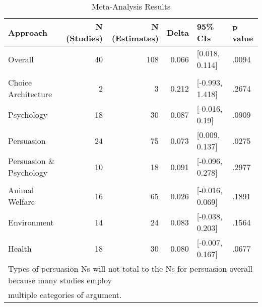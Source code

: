 \documentclass[sn-nature,referee,pdflatex]{sn-jnl}
\begin{document}
\begin{table}

\caption{\label{tab:table_one}Meta-Analysis Results}
\centering
\begin{tabular}[t]{lrrrll}
\toprule
Approach & N (Studies) & N (Estimates) & Delta & 95\% CIs & p value\\
\midrule
Overall & 40 & 108 & 0.066 & {}[0.018, 0.114] & .0094\\
\addlinespace[0.5em]
\multicolumn{6}{l}{\textbf{Theory}}\\
\hspace{1em}Choice Architecture & 2 & 3 & 0.212 & {}[-0.993, 1.418] & .2674\\
\hspace{1em}Psychology & 18 & 30 & 0.087 & {}[-0.016, 0.19] & .0909\\
\hspace{1em}Persuasion & 24 & 75 & 0.073 & {}[0.009, 0.137] & .0275\\
\hspace{1em}Persuasion \& Psychology & 10 & 18 & 0.091 & {}[-0.096, 0.278] & .2977\\
\addlinespace[0.5em]
\multicolumn{6}{l}{\textbf{Type of Persuasion}}\\
\hspace{1em}Animal Welfare & 16 & 65 & 0.026 & {}[-0.016, 0.069] & .1891\\
\hspace{1em}Environment & 14 & 24 & 0.083 & {}[-0.038, 0.203] & .1564\\
\hspace{1em}Health & 18 & 30 & 0.080 & {}[-0.007, 0.167] & .0677\\
\bottomrule
\multicolumn{6}{l}{\textsuperscript{} Types of persuasion Ns will not total to the Ns for persuasion overall because many studies employ}\\
\multicolumn{6}{l}{multiple categories of argument.}\\
\end{tabular}
\end{table}
\end{document}
